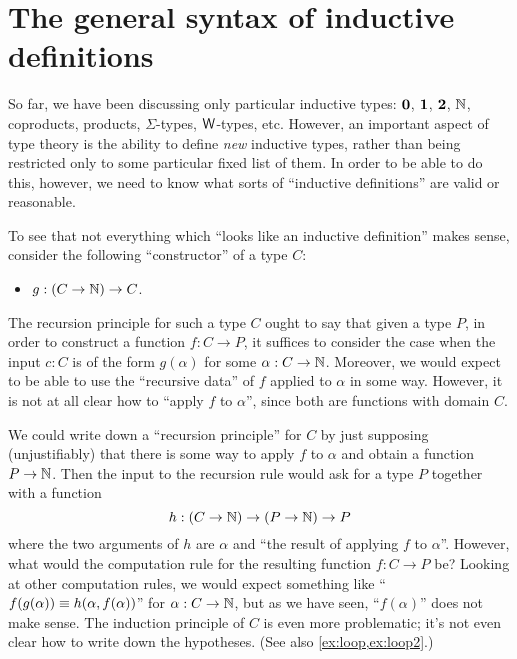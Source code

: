 
\section{The general syntax of inductive definitions}
\label{sec:strictly-positive}

%
%

So far, we have been discussing only particular inductive types: $\mathbf{0}$, $\mathbf{1}$, $\mathbf{2}$, $\mathbb{N}$, coproducts, products, $\Sigma$-types, $\mathsf{W}$-types, etc.
However, an important aspect of type theory is the ability to define \emph{new} inductive types, rather than being restricted only to some particular fixed list of them.
In order to be able to do this, however, we need to know what sorts of ``inductive definitions'' are valid or reasonable.

To see that not everything which ``looks like an inductive definition'' makes sense, consider the following ``constructor'' of a type $C$:
\begin{itemize}
\item $g:(C\to \mathbb{N}) \to C$.
\end{itemize}
The recursion principle for such a type $C$ ought to say that given a type $P$, in order to construct a function $f:C\to P$, it suffices to consider the case when the input $c:C$ is of the form $g(\alpha)$ for some $\alpha:C\to\mathbb{N}$.
Moreover, we would expect to be able to use the ``recursive data'' of $f$ applied to $\alpha$ in some way.
However, it is not at all clear how to ``apply $f$ to $\alpha$'', since both are functions with domain $C$.

We could write down a ``recursion principle'' for $C$ by just supposing (unjustifiably) that there is some way to apply $f$ to $\alpha$ and obtain a function $P\to\mathbb{N}$.
Then the input to the recursion rule would ask for a type $P$ together with a function
\begin{equation}
  h:(C\to\nat) \to (P\to\nat) \to P\label{eq:fake-recursor}
\end{equation}
where the two arguments of $h$ are $\alpha$ and ``the result of applying $f$ to $\alpha$''.
However, what would the computation rule for the resulting function $f:C\to P$ be?
Looking at other computation rules, we would expect something like ``$f(g(\alpha)) \equiv h(\alpha,f(\alpha))$'' for $\alpha:C\to\mathbb{N}$, but as we have seen, ``$f(\alpha)$'' does not make sense.
The induction principle of $C$ is even more problematic; it's not even clear how to write down the hypotheses.
(See also \autoref{ex:loop,ex:loop2}.)

